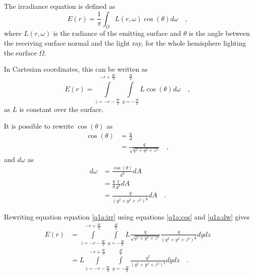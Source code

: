 \documentclass{report}
\begin{document}
The irradiance equation is defined as 
\begin{equation}
E(r) = \frac{1}{\pi} \int_{\Omega} L(r,\omega)\cos(\theta) d\omega
\quad,
\end{equation}
where $L(r,\omega)$ is the radiance of the emitting surface and $\theta$ is the angle between the receiving surface normal and the light ray, for the whole hemisphere lighting the surface $\Omega$.

In Cartesian coordinates, this can be written as
\begin{equation}
E(r) = \int\limits_{z= -r - \frac{W}{2}}^{-r+\frac{W}{2}} \int\limits_{y= - \frac{H}{2}}^{\frac{H}{2}} L \cos(\theta) d\omega
\quad,
\label{q1a:irr}
\end{equation}
as $L$ is constant over the surface.

It is possible to rewrite $\cos(\theta)$ as
\begin{align}
\cos(\theta)  &= \frac{q}{d} \\
              &= \frac{q}{\sqrt{q^2 + y^2 + z^2}}
\quad,
\label{q1a:cos}
\end{align}
and $d\omega$ as
\begin{align}
d\omega &= \frac{\cos(\theta)}{d^2} dA \\
        &= \frac{q}{d} \frac{1}{d^2} dA \\
        &= \frac{q}{\left(q^2 + y^2 + z^2\right)^\frac{3}{2}} dA
\quad.
\label{q1a:dw}
\end{align}

Rewriting equation equation \eqref{q1a:irr} using equations \eqref{q1a:cos} and \eqref{q1a:dw} gives
\begin{align}
E(r) &= \int\limits_{z= -r - \frac{W}{2}}^{-r+\frac{W}{2}} \int\limits_{y= - \frac{H}{2}}^{\frac{H}{2}} L \frac{q}{\sqrt{q^2 + y^2 + z^2}} \frac{q}{\left(q^2 + y^2 + z^2\right)^\frac{3}{2}} dydz \\
     &= L \int\limits_{z= -r - \frac{W}{2}}^{-r+\frac{W}{2}} \int\limits_{y= - \frac{H}{2}}^{\frac{H}{2}} \frac{q^2}{\left(q^2 + y^2 + z^2\right)^2} dydz 
\quad.
\end{align}
\end{document}
